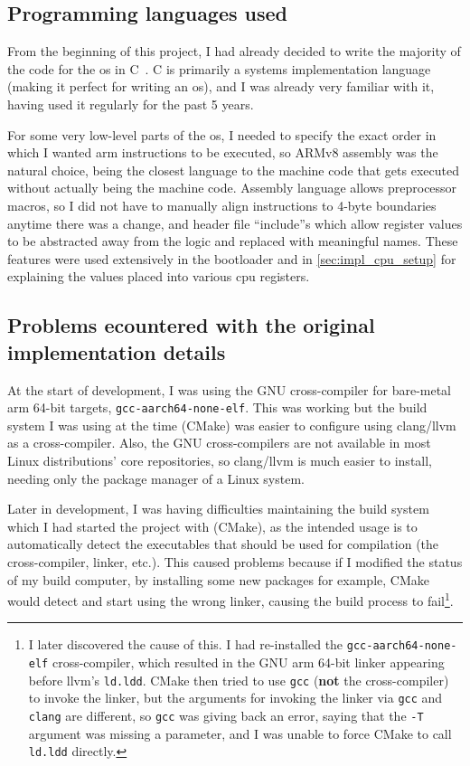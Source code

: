 \documentclass{article}
\begin{document}
\subsection{Programming languages used}
From the beginning of this project, I had already decided to write the majority
of the code for the \gls{os} in C~\cite{c-programming-language}. C is primarily
a systems implementation language (making it perfect for writing an \gls{os}),
and I was already very familiar with it, having used it regularly for the past
5 years.

For some very low-level parts of the \gls{os}, I needed to specify the exact
order in which I wanted \gls{arm} instructions to be executed, so ARMv8
assembly was the natural choice, being the closest language to the machine code
that gets executed without actually being the machine code. Assembly language
allows preprocessor macros, so I did not have to manually align instructions to
4-byte boundaries anytime there was a change, and header file ``include''s
which allow register values to be abstracted away from the logic and replaced
with meaningful names. These features were used extensively in the bootloader
and in \autoref{sec:impl_cpu_setup} for explaining the values placed into
various \gls{cpu} registers.

\subsection{Problems ecountered with the original implementation details}
At the start of development, I was using the GNU cross-compiler for bare-metal
\gls{arm} 64-bit targets, \texttt{gcc-aarch64-none-elf}. This was working but
the build system I was using at the time (CMake) was easier to configure using
clang/llvm as a cross-compiler. Also, the GNU cross-compilers are not available
in most Linux distributions' core repositories, so clang/llvm is much easier to
install, needing only the package manager of a Linux system.

Later in development, I was having difficulties maintaining the build system
which I had started the project with (CMake), as the intended usage is to
automatically detect the executables that should be used for compilation (the
cross-compiler, linker, etc.). This caused problems because if I modified the
status of my build computer, by installing some new packages for example, CMake
would detect and start using the wrong linker, causing the build process to
fail\footnote{I later discovered the cause of this. I had re-installed the
\texttt{gcc-aarch64-none-elf} cross-compiler, which resulted in the GNU
\gls{arm} 64-bit linker appearing before llvm's \texttt{ld.ldd}. CMake then
tried to use \texttt{gcc} (\textbf{not} the cross-compiler) to invoke the
linker, but the arguments for invoking the linker via \texttt{gcc} and
\texttt{clang} are different, so \texttt{gcc} was giving back an error, saying
that the \texttt{-T} argument was missing a parameter, and I was unable to
force CMake to call \texttt{ld.ldd} directly.}.
\end{document}
